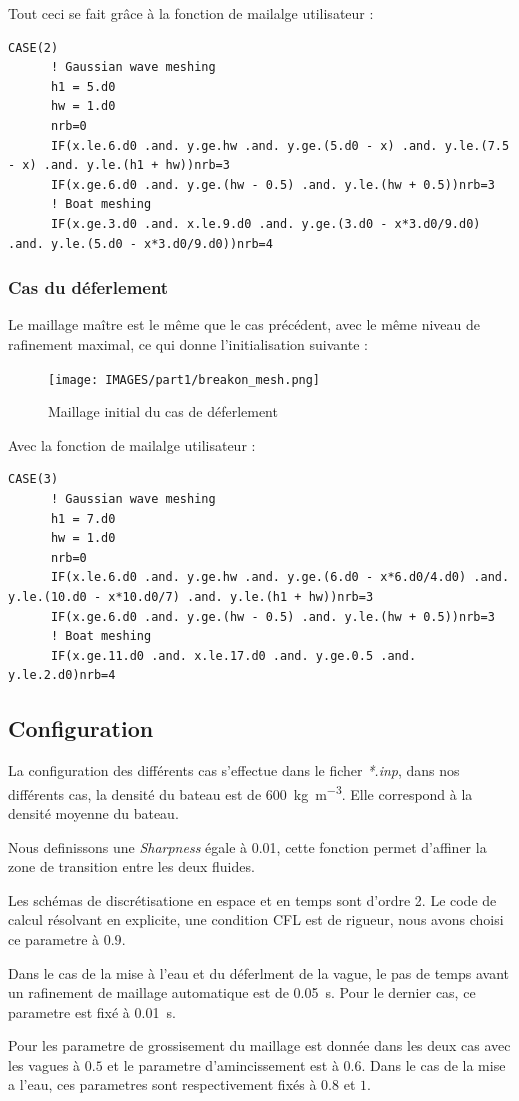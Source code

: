 \documentclass[../main.tex]{subfiles}
\begin{document}
Tout ceci se fait grâce à la fonction de mailalge utilisateur :
\begin{lstlisting}[style=f90, caption={Maillge utilisateur pour le cas de \textit{surf}}, captionpos=b]
    CASE(2)
      ! Gaussian wave meshing
      h1 = 5.d0
      hw = 1.d0
      nrb=0
      IF(x.le.6.d0 .and. y.ge.hw .and. y.ge.(5.d0 - x) .and. y.le.(7.5 - x) .and. y.le.(h1 + hw))nrb=3
      IF(x.ge.6.d0 .and. y.ge.(hw - 0.5) .and. y.le.(hw + 0.5))nrb=3
      ! Boat meshing
      IF(x.ge.3.d0 .and. x.le.9.d0 .and. y.ge.(3.d0 - x*3.d0/9.d0) .and. y.le.(5.d0 - x*3.d0/9.d0))nrb=4
\end{lstlisting}

\subsubsection{Cas du déferlement}
Le maillage maître est le même que le cas précédent, avec le même niveau de rafinement maximal, ce qui donne l'initialisation suivante :
\begin{figure}[H]
    \centering
    \texttt{[image: IMAGES/part1/breakon\_mesh.png]}
    \caption{Maillage initial du cas de déferlement}
\end{figure}

Avec la fonction de mailalge utilisateur :
\begin{lstlisting}[style=f90, caption={Maillage utilisateur pour le cas de déferlement}, captionpos=b]
    CASE(3)
      ! Gaussian wave meshing
      h1 = 7.d0
      hw = 1.d0
      nrb=0
      IF(x.le.6.d0 .and. y.ge.hw .and. y.ge.(6.d0 - x*6.d0/4.d0) .and. y.le.(10.d0 - x*10.d0/7) .and. y.le.(h1 + hw))nrb=3
      IF(x.ge.6.d0 .and. y.ge.(hw - 0.5) .and. y.le.(hw + 0.5))nrb=3
      ! Boat meshing
      IF(x.ge.11.d0 .and. x.le.17.d0 .and. y.ge.0.5 .and. y.le.2.d0)nrb=4
\end{lstlisting}



\subsection{Configuration}

La configuration des différents cas s'effectue dans le ficher \textit{*.inp}, dans nos différents cas, la densité du bateau est de \qty{600}{\kilogram\per\cubic\m}. Elle correspond à la densité moyenne du bateau.

Nous definissons une \textit{Sharpness} égale à 0.01, cette fonction permet d'affiner la zone de transition entre les deux fluides.


Les schémas de discrétisatione en espace et en temps sont d'ordre 2. Le code de calcul résolvant en explicite, une condition CFL est de rigueur, nous avons choisi ce parametre à $0.9$.


Dans le cas de la mise à l'eau et du déferlment de la vague, le pas de temps avant un rafinement de maillage automatique est de \qty{0.05}{s}. Pour le dernier cas, ce parametre est fixé à \qty{0.01}{s}.

Pour les parametre de grossisement du maillage est donnée dans les deux cas avec les vagues à $0.5$ et le parametre d'amincissement est à $0.6$.
Dans le cas de la mise a l'eau, ces parametres sont respectivement fixés à $0.8$ et $1$.
\end{document}
